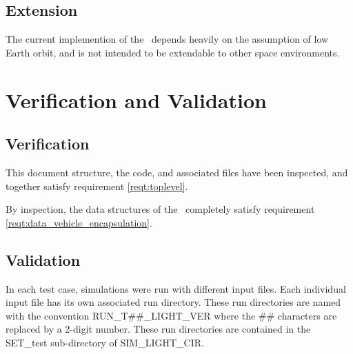 \section{Extension}

The current implemention of the \earthlightingDesc\ depends heavily on the
assumption of low Earth orbit, and is not intended to be extendable to other
space environments.


\chapter{Verification and Validation}\label{ch:ivv}

\section{Verification}

\label{inspect:TLI}
 This document structure, the code, and associated files have been inspected, and together satisfy requirement \ref{reqt:toplevel}.


\label{inspect:data_conversion}
By inspection, the data structures of the \earthlightingDesc\ completely satisfy
requirement \ref{reqt:data_vehicle_encapsulation}.


\section{Validation}
In each test case, simulations were run with different input files.  Each
individual input file has its own associated run directory.  These run
directories are named with the convention RUN\_T\#\#\_LIGHT\_VER where the
\#\# characters are replaced by a 2-digit number.  These run directories are
contained in the SET\_test sub-directory of SIM\_LIGHT\_CIR.

